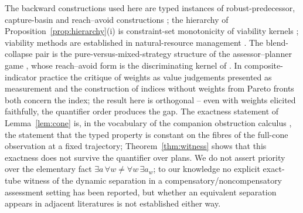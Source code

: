 \documentclass[preprint,11pt,authoryear]{elsarticle}
\theoremstyle{definition}
\theoremstyle{remark}
\begin{document}
The backward constructions used here are typed instances of robust-predecessor, capture-basin and reach--avoid constructions \citep{Aubin1991,Aubin2011,SaintPierre1994,Lygeros1999,AubinCatte2002}; the hierarchy of Proposition~\ref{prop:hierarchy}(i) is constraint-set monotonicity of viability kernels \citep{Aubin1991,Frankowska1989}; viability methods are established in natural-resource management \citep{DeLaraDoyen2008,Doyen2012}. The blend-collapse pair is the pure-versus-mixed-strategy structure of the assessor--planner game \citep{vonNeumann1928,Sion1958}, whose reach--avoid form is the discriminating kernel of \citet{Cardaliaguet1996} \citep[numerically,][]{Cardaliaguet1999}. In composite-indicator practice the critique of weights as value judgements presented as measurement \citep{Hickel2020,Fischer2022} and the construction of indices without weights from Pareto fronts \citep{Gao2023} both concern the index; the result here is orthogonal -- even with weights elicited faithfully, the quantifier order produces the gap. The exactness statement of Lemma~\ref{lem:cone} is, in the vocabulary of the companion obstruction calculus \citep{Abaee2026obs}, the statement that the typed property is constant on the fibres of the full-cone observation at a fixed trajectory; Theorem~\ref{thm:witness} shows that this exactness does not survive the quantifier over plans. We do not assert priority over the elementary fact $\exists a\,\forall w\ne\forall w\,\exists a_w$; to our knowledge no explicit exact-tube witness of the dynamic separation in a compensatory/noncompensatory assessment setting has been reported, but whether an equivalent separation appears in adjacent literatures is not established either way.
\end{document}
